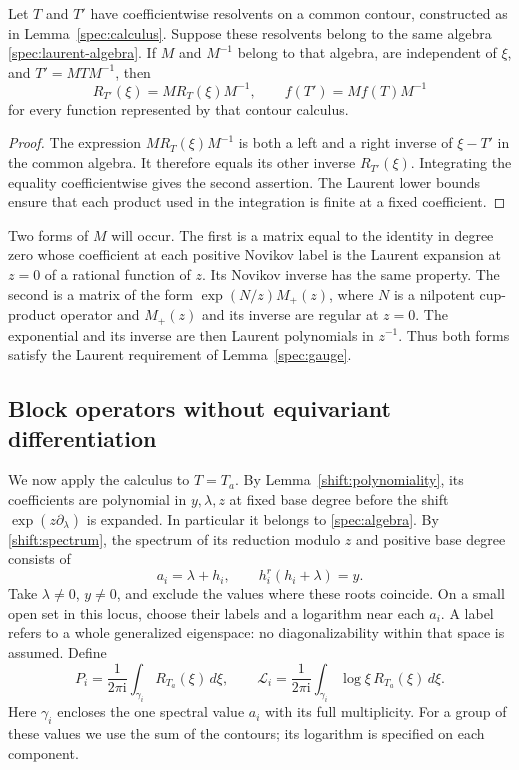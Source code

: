 \begin{lemma}
\label{spec:gauge}
Let $T$ and $T'$ have coefficientwise resolvents on a common contour,
constructed as in Lemma~\ref{spec:calculus}.  Suppose these resolvents
belong to the same algebra \eqref{spec:laurent-algebra}.  If $M$ and
$M^{-1}$ belong to that algebra, are independent of $\xi$, and
$T'=MTM^{-1}$, then
\[
 R_{T'}(\xi)=M R_T(\xi)M^{-1},\qquad
 f(T')=M f(T)M^{-1}
\]
for every function represented by that contour calculus.
\end{lemma}

\begin{proof}
The expression $M R_T(\xi)M^{-1}$ is both a left and a right inverse
of $\xi-T'$ in the common algebra.  It therefore equals its other
inverse $R_{T'}(\xi)$.  Integrating the equality coefficientwise
gives the second assertion.  The Laurent lower bounds ensure that
each product used in the integration is finite at a fixed
coefficient.
\end{proof}

Two forms of $M$ will occur.  The first is a matrix equal to the
identity in degree zero whose coefficient at each positive Novikov
label is the Laurent expansion at $z=0$ of a rational function of $z$.
Its Novikov inverse has the same property.  The second is a matrix
of the form $\exp(N/z)M_+(z)$, where $N$ is a nilpotent cup-product
operator and $M_+(z)$ and its inverse are regular at $z=0$.
The exponential and its inverse are then Laurent polynomials in
$z^{-1}$.  Thus both forms satisfy the Laurent requirement of
Lemma~\ref{spec:gauge}.

\subsection{Block operators without equivariant differentiation}

We now apply the calculus to $T=T_a$.  By
Lemma~\ref{shift:polynomiality}, its coefficients are polynomial in
$y,\lambda,z$ at fixed base degree before the shift
$\exp(z\partial_\lambda)$ is expanded.  In particular it belongs
to \eqref{spec:algebra}.  By \eqref{shift:spectrum}, the spectrum of
its reduction modulo $z$ and positive base degree consists of
\begin{equation}
 a_i=\lambda+h_i,\qquad h_i^r(h_i+\lambda)=y.
 \label{spec:eigenvalues}
\end{equation}
Take $\lambda\neq0$, $y\neq0$, and exclude the values where these
roots coincide.  On a small open set in this locus, choose their
labels and a logarithm near each $a_i$.  A label refers to a whole
generalized eigenspace: no diagonalizability within that space is
assumed.  Define
\begin{equation}
 P_i=\frac{1}{2\pi\mathrm i}\int_{\gamma_i}R_{T_a}(\xi)\,d\xi,
 \qquad
 \mathscr L_i=\frac{1}{2\pi\mathrm i}\int_{\gamma_i}
                  \log\xi\,R_{T_a}(\xi)\,d\xi.
 \label{spec:projectors}
\end{equation}
Here $\gamma_i$ encloses the one spectral value $a_i$ with its full
multiplicity.  For a group of these values we use the sum of the
contours; its logarithm is specified on each component.

